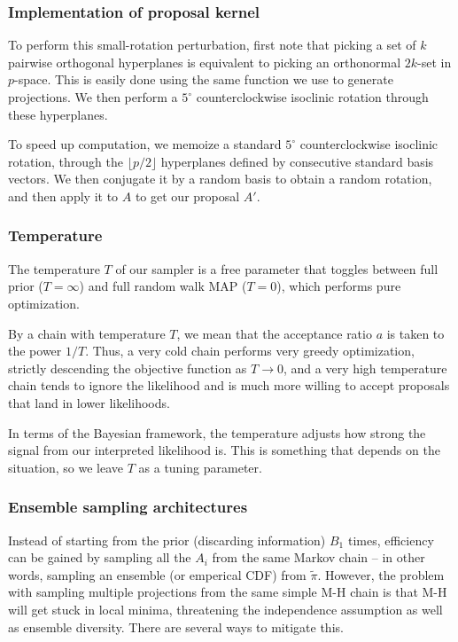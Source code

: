 \documentclass{amsart}
\begin{document}
\subsubsection{Implementation of proposal kernel}

To perform this small-rotation perturbation, first note that picking a set of $k$ pairwise orthogonal hyperplanes is equivalent to picking an orthonormal $2k$-set in $p$-space. This is easily done using the same function we use to generate projections. We then perform a $5^\circ$ counterclockwise isoclinic rotation through these hyperplanes.

To speed up computation, we memoize a standard $5^\circ$ counterclockwise isoclinic rotation, through the $\lfloor p/2 \rfloor$ hyperplanes defined by consecutive standard basis vectors. We then conjugate it by a random basis to obtain a random rotation, and then apply it to $A$ to get our proposal $A'$.

\subsubsection{Temperature}

The temperature $T$ of our sampler is a free parameter that toggles between full prior ($T=\infty$) and full random walk MAP ($T=0$), which performs pure optimization.

By a chain with temperature $T$, we mean that the acceptance ratio $a$ is taken to the power $1/T$. Thus, a very cold chain performs very greedy optimization, strictly descending the objective function as $T\to 0$, and a very high temperature chain tends to ignore the likelihood and is much more willing to accept proposals that land in lower likelihoods.

In terms of the Bayesian framework, the temperature adjusts how strong the signal from our interpreted likelihood is. This is something that depends on the situation, so we leave $T$ as a tuning parameter.

\subsubsection{Ensemble sampling architectures}

Instead of starting from the prior (discarding information) $B_1$ times, efficiency can be gained by sampling all the $A_i$ from the same Markov chain -- in other words, sampling an ensemble (or emperical CDF) from $\tilde\pi$. However, the problem with sampling multiple projections from the same simple M-H chain is that M-H will get stuck in local minima, threatening the independence assumption as well as ensemble diversity. There are several ways to mitigate this.
\end{document}
